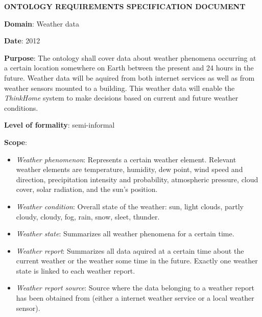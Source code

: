 \begin{mdframed}
\setlength{\parindent}{0pt}
\MakeUppercase{\textbf{Ontology requirements specification document}}

\vspace{.5cm}

\textbf{Domain}: Weather data

\vspace{.2cm}

\textbf{Date}: 2012 %

\vspace{.2cm}

\textbf{Purpose}: The ontology shall cover data about weather phenomena occurring at a certain location somewhere on Earth between the present and 24 hours in the future. Weather data will be aquired from both internet services as well as from weather sensors mounted to a building. This weather data will enable the \textit{ThinkHome} system to make decisions based on current and future weather conditions.

\vspace{.2cm}

\textbf{Level of formality}: semi-informal %

\vspace{.2cm}

\textbf{Scope}:

\begin{itemize}
  \item \emph{Weather phenomenon}: Represents a certain weather element. Relevant weather elements are temperature, humidity, dew point, wind speed and direction, precipitation intensity and probability, atmospheric pressure, cloud cover, solar radiation, and the sun's position.
  \item \emph{Weather condition}: Overall state of the weather: sun, light clouds, partly cloudy, cloudy, fog, rain, snow, sleet, thunder.
  \item \emph{Weather state}: Summarizes all weather phenomena for a certain time. 
  \item \emph{Weather report}: Summarizes all data aquired at a certain time about the current weather or the weather some time in the future. Exactly one weather state is linked to each weather report.
  \item \emph{Weather report source}: Source where the data belonging to a weather report has been obtained from (either a internet weather service or a local weather sensor).
\end{itemize}


\end{mdframed}
